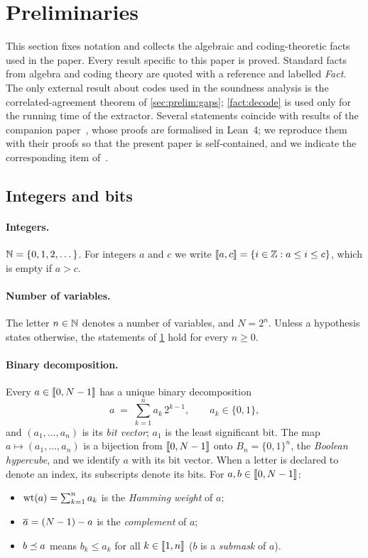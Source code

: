 \section{Preliminaries}\label{sec:prelim}

This section fixes notation and collects the algebraic and coding-theoretic facts used in the paper.
Every result specific to this paper is proved.
Standard facts from algebra and coding theory are quoted with a reference and labelled \emph{Fact}.
The only external result about codes used in the soundness analysis is the correlated-agreement theorem of \cref{sec:prelim:gaps}; \cref{fact:decode} is used only for the running time of the extractor.
Several statements coincide with results of the companion paper~\cite{Mkh26}, whose proofs are formalised in Lean~4; we reproduce them with their proofs so that the present paper is self-contained, and we indicate the corresponding item of~\cite{Mkh26}.

\subsection{Integers and bits}\label{sec:prelim:bits}

\paragraph{Integers.}
$\mathbb{N} = \{0,1,2,\dots\}$.
For integers $a$ and $c$ we write $\llbracket a, c \rrbracket = \{ i \in \mathbb{Z} : a \le i \le c \}$, which is empty if $a > c$.

\paragraph{Number of variables.}
The letter $n \in \mathbb{N}$ denotes a number of variables, and $N = 2^n$.
Unless a hypothesis states otherwise, the statements of \cref{sec:prelim} hold for every $n \ge 0$.

\paragraph{Binary decomposition.}
Every $a \in \llbracket 0, N-1 \rrbracket$ has a unique binary decomposition
\[
  a \;=\; \sum_{k=1}^{n} a_k\, 2^{k-1}, \qquad a_k \in \{0,1\},
\]
and $(a_1,\dots,a_n)$ is its \emph{bit vector}; $a_1$ is the least significant bit.
The map $a \mapsto (a_1,\dots,a_n)$ is a bijection from $\llbracket 0, N-1 \rrbracket$ onto $B_n = \{0,1\}^n$, the \emph{Boolean hypercube}, and we identify $a$ with its bit vector.
When a letter is declared to denote an index, its subscripts denote its bits.
For $a, b \in \llbracket 0, N-1 \rrbracket$:
\begin{itemize}
  \item $\mathrm{wt}(a) = \sum_{k=1}^n a_k$ is the \emph{Hamming weight} of $a$;
  \item $\overline{a} = (N-1) - a$ is the \emph{complement} of $a$;
  \item $b \preceq a$ means $b_k \le a_k$ for all $k \in \llbracket 1, n \rrbracket$ ($b$ is a \emph{submask} of $a$).
\end{itemize}

